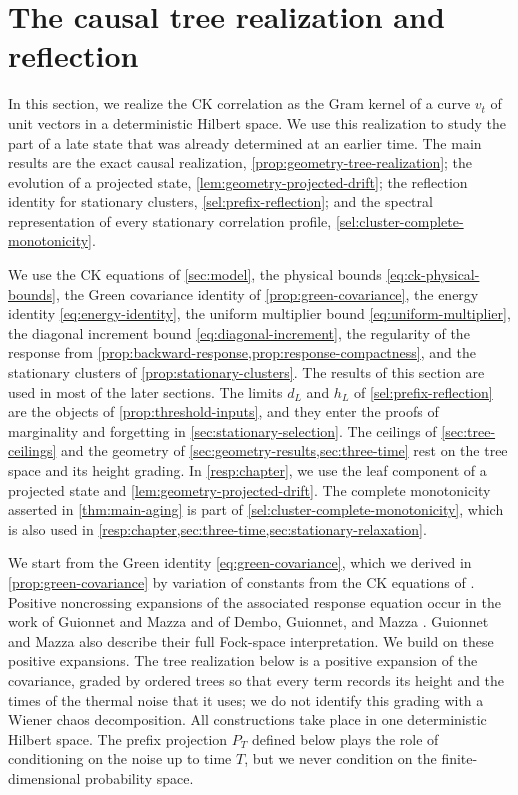 \chapter{The causal tree realization and reflection}\label{sec:geometry-core}

In this section, we realize the CK correlation as the Gram kernel of a curve $v_t$ of unit vectors in a deterministic Hilbert space. We use this realization to study the part of a late state that was already determined at an earlier time. The main results are the exact causal realization, \cref{prop:geometry-tree-realization}; the evolution of a projected state, \cref{lem:geometry-projected-drift}; the reflection identity for stationary clusters, \cref{sel:prefix-reflection}; and the spectral representation of every stationary correlation profile, \cref{sel:cluster-complete-monotonicity}.

We use the CK equations of \cref{sec:model}, the physical bounds \eqref{eq:ck-physical-bounds}, the Green covariance identity of \cref{prop:green-covariance}, the energy identity \eqref{eq:energy-identity}, the uniform multiplier bound \eqref{eq:uniform-multiplier}, the diagonal increment bound \eqref{eq:diagonal-increment}, the regularity of the response from \cref{prop:backward-response,prop:response-compactness}, and the stationary clusters of \cref{prop:stationary-clusters}. The results of this section are used in most of the later sections. The limits $d_L$ and $h_L$ of \cref{sel:prefix-reflection} are the objects of \cref{prop:threshold-inputs}, and they enter the proofs of marginality and forgetting in \cref{sec:stationary-selection}. The ceilings of \cref{sec:tree-ceilings} and the geometry of \cref{sec:geometry-results,sec:three-time} rest on the tree space and its height grading. In \cref{resp:chapter}, we use the leaf component of a projected state and \cref{lem:geometry-projected-drift}. The complete monotonicity asserted in \cref{thm:main-aging} is part of \cref{sel:cluster-complete-monotonicity}, which is also used in \cref{resp:chapter,sec:three-time,sec:stationary-relaxation}.

We start from the Green identity \eqref{eq:green-covariance}, which we derived in \cref{prop:green-covariance} by variation of constants from the CK equations of \cite{bag2006,dgm2007}. Positive noncrossing expansions of the associated response equation occur in the work of Guionnet and Mazza \cite[Section~2.1 and Lemma~2.1]{guionnetmazza2005} and of Dembo, Guionnet, and Mazza \cite[Section~2]{dgm2007}. Guionnet and Mazza also describe their full Fock-space interpretation. We build on these positive expansions. The tree realization below is a positive expansion of the covariance, graded by ordered trees so that every term records its height and the times of the thermal noise that it uses; we do not identify this grading with a Wiener chaos decomposition. All constructions take place in one deterministic Hilbert space. The prefix projection $P_T$ defined below plays the role of conditioning on the noise up to time $T$, but we never condition on the finite-dimensional probability space.


